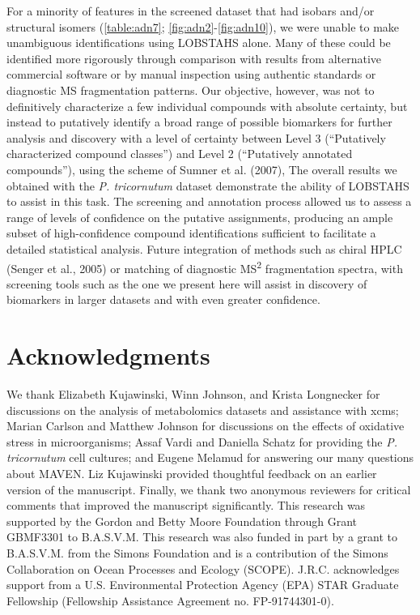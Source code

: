 For a minority of features in the screened dataset that had isobars and/or structural isomers (\autoref{table:adn7}; \autoref{fig:adn2}-\autoref{fig:adn10}), we were unable to make unambiguous identifications using LOBSTAHS alone. Many of these could be identified more rigorously through comparison with results from alternative commercial software or by manual inspection using authentic standards or diagnostic MS fragmentation patterns. Our objective, however, was not to definitively characterize a few individual compounds with absolute certainty, but instead to putatively identify a broad range of possible biomarkers for further analysis and discovery with a level of certainty between Level 3 (``Putatively characterized compound classes'') and Level 2 (``Putatively annotated compounds''), using the scheme of Sumner et al. (2007), The overall results we obtained with the \emph{P. tricornutum} dataset demonstrate the ability of LOBSTAHS to assist in this task. The screening and annotation process allowed us to assess a range of levels of confidence on the putative assignments, producing an ample subset of high-confidence compound identifications sufficient to facilitate a detailed statistical analysis. Future integration of methods such as chiral HPLC (Senger et al., 2005) or matching of diagnostic MS\textsuperscript{2} fragmentation spectra, with screening tools such as the one we present here will assist in discovery of biomarkers in larger datasets and with even greater confidence.

\section{Acknowledgments }

We thank Elizabeth Kujawinski, Winn Johnson, and Krista Longnecker for discussions on the analysis of metabolomics datasets and assistance with xcms; Marian Carlson and Matthew Johnson for discussions on the effects of oxidative stress in microorganisms; Assaf Vardi and Daniella Schatz for providing the \emph{P. tricornutum} cell cultures; and Eugene Melamud for answering our many questions about MAVEN. Liz Kujawinski provided thoughtful feedback on an earlier version of the manuscript. Finally, we thank two anonymous reviewers for critical comments that improved the manuscript significantly. This research was supported by the Gordon and Betty Moore Foundation through Grant GBMF3301 to B.A.S.V.M. This research was also funded in part by a grant to B.A.S.V.M. from the Simons Foundation and is a contribution of the Simons Collaboration on Ocean Processes and Ecology (SCOPE). J.R.C. acknowledges support from a U.S. Environmental Protection Agency (EPA) STAR Graduate Fellowship (Fellowship Assistance Agreement no. FP-91744301-0).

